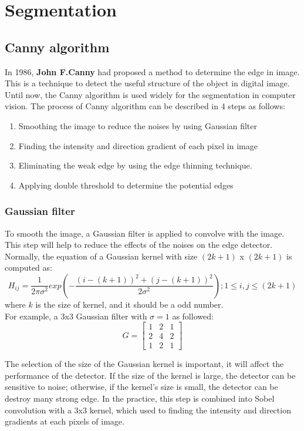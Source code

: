 \chapter{Segmentation}
\section{Canny algorithm}
In 1986, \textbf{John F.Canny} had proposed a method to determine the edge in image. This is a technique to detect the useful structure of the object in digital image. Until now, the Canny algorithm\cite{canny1986computational} is used widely for the segmentation in computer vision. The process of Canny algorithm can be described in 4 steps as follows:
\begin{enumerate}
	\item Smoothing the image to reduce the noises by using Gaussian filter
	\item Finding the intensity and direction gradient of each pixel in image
	\item Eliminating the weak edge by using the edge thinning technique.
	\item Applying double threshold to determine the potential edges
\end{enumerate}
	\subsection{Gaussian filter}
	To smooth the image, a Gaussian filter is applied to convolve with the image. This step will help to reduce the effects of the noises on the edge detector. Normally, the equation of a Gaussian kernel with size $(2k+1)$ x $(2k + 1)$  is computed as:
	\begin{equation}
	H_{ij}=\frac{1}{2\pi\sigma^2}exp(-\frac{(i-(k+1))^2 + (j-(k+1))^2}{2\sigma^2});1\leq i,j \leq (2k+1)
	\end{equation}
	where $k$ is the size of kernel, and it should be a odd number.\\
	For example, a 3x3 Gaussian filter with $\sigma = 1 $ as followed:
	\begin{equation}
		G = 
		\begin{bmatrix}
		1 & 2 & 1\\
		2 & 4 & 2\\
		1 & 2 & 1		
		\end{bmatrix}
	\end{equation}	
	
	The selection of the size of the Gaussian kernel is important, it will affect the performance of the detector. If the size of the kernel is large, the detector can be sensitive to noise; otherwise, if the kernel's size is small, the detector can be destroy many strong edge. In the practice, this step is combined into Sobel convolution with a 3x3 kernel, which used to finding the intensity and direction gradients at each pixels of image.
